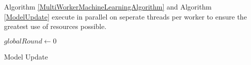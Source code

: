 \documentclass[12pt]{article}
\begin{document}
\medskip
\medskip

Algorithm \ref{MultiWorkerMachineLearningAlgorithm} and Algorithm \ref{ModelUpdate} execute in parallel on seperate threads per worker to ensure the greatest use of resources possible.
\newline

\IncMargin{1em}
\begin{algorithm}[H]
  $globalRound \longleftarrow 0$\;
 \caption{Model Update}
 \label{ModelUpdate}
\end{algorithm}
\DecMargin{1em}
\medskip

\newpage



\end{document}
